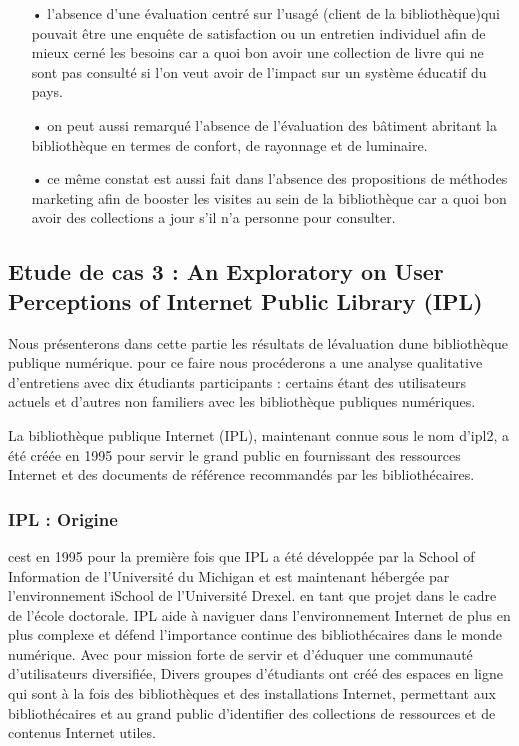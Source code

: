 \documentclass[french,a4paper,12pt]{article}
\begin{document}
\begin{enumerate}
\item[•] l'absence d'une évaluation centré sur l'usagé (client de la bibliothèque)qui pouvait être une enquête de satisfaction ou un entretien individuel afin de mieux cerné les besoins car a quoi bon avoir une collection de livre qui ne sont pas consulté si l'on veut avoir de l'impact sur un système éducatif du pays.
\item[•] on peut aussi remarqué l'absence de l'évaluation des bâtiment abritant la bibliothèque en termes de confort, de rayonnage et de luminaire. 
\item[•] ce même constat est aussi fait dans l'absence des propositions de méthodes marketing afin de booster les visites au sein de la bibliothèque car a quoi bon avoir des collections a jour s'il n'a personne pour consulter.
\end{enumerate} 

\newpage


\subsection{Etude de cas 3 :  An Exploratory on User Perceptions of Internet Public Library (IPL) \citep{Maceli}} 

\quad Nous présenterons dans cette partie les résultats de lévaluation dune  bibliothèque publique numérique. pour ce faire nous procéderons a  une analyse qualitative d'entretiens avec dix étudiants participants : certains étant des utilisateurs actuels et d'autres non familiers avec les bibliothèque publiques numériques.

\quad La bibliothèque publique Internet (IPL), maintenant connue sous le nom d'ipl2, a été créée en 1995 pour servir le grand public en fournissant des ressources Internet et des documents de référence recommandés par les bibliothécaires. 

\subsubsection{ IPL : Origine}

\quad cest  en 1995 pour la première fois que IPL a été  développée par la School of Information de l'Université du Michigan et est maintenant hébergée par l'environnement iSchool de l'Université Drexel.  en tant que projet dans le cadre de l'école doctorale.  IPL aide à naviguer dans l'environnement Internet de plus en plus complexe et défend l'importance continue des bibliothécaires dans le monde numérique. Avec pour mission forte de servir et d'éduquer une communauté d'utilisateurs diversifiée, Divers groupes d'étudiants ont créé des espaces en ligne qui sont à la fois des bibliothèques et des installations Internet, permettant aux bibliothécaires et au grand public d'identifier des collections de ressources et de contenus Internet utiles. 
\end{document}

